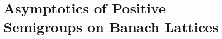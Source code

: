 \setcounter{chapter}{3}
\chapter{Asymptotics of Positive Semigroups on Banach Lattices}\label{chap:C-IV} %
